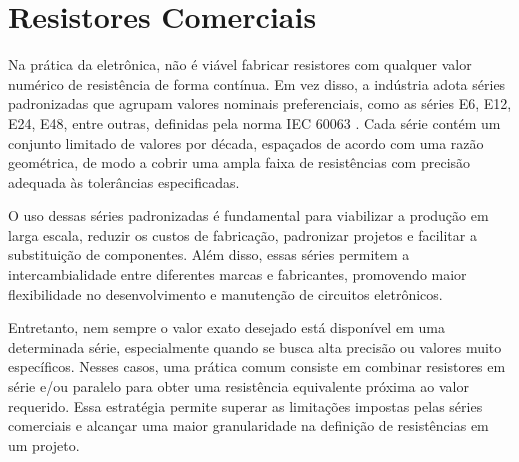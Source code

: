 \documentclass[conference]{IEEEtran}
\begin{document}
\section{Resistores Comerciais}




Na prática da eletrônica, não é viável fabricar resistores com qualquer valor numérico de resistência de forma contínua. Em vez disso, a indústria adota séries padronizadas que agrupam valores nominais preferenciais, como as séries E6, E12, E24, E48, entre outras, definidas pela norma IEC 60063 \cite{iec60063}. Cada série contém um conjunto limitado de valores por década, espaçados de acordo com uma razão geométrica, de modo a cobrir uma ampla faixa de resistências com precisão adequada às tolerâncias especificadas.

O uso dessas séries padronizadas é fundamental para viabilizar a produção em larga escala, reduzir os custos de fabricação, padronizar projetos e facilitar a substituição de componentes. Além disso, essas séries permitem a intercambialidade entre diferentes marcas e fabricantes, promovendo maior flexibilidade no desenvolvimento e manutenção de circuitos eletrônicos.

Entretanto, nem sempre o valor exato desejado está disponível em uma determinada série, especialmente quando se busca alta precisão ou valores muito específicos. Nesses casos, uma prática comum consiste em combinar resistores em série e/ou paralelo para obter uma resistência equivalente próxima ao valor requerido. Essa estratégia permite superar as limitações impostas pelas séries comerciais e alcançar uma maior granularidade na definição de resistências em um projeto.
\end{document}
